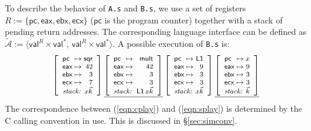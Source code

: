 \documentclass[sigplan,screen,review]{acmart}
\newcommand{\kw}[1]{\ensuremath{ \mathsf{#1} }}
\begin{document}
\begin{example}
To describe the behavior of \texttt{A.s} and \texttt{B.s},
we use a set of registers
$R := \{ \kw{pc}, \kw{eax}, \kw{ebx}, \kw{ecx} \}$
($\kw{pc}$ is the program counter)
together with a stack of pending return addresses.
The corresponding language interface can be defined as
$\tilde{\mathcal{A}} :=
 \langle \kw{val}^R \times \kw{val}^*, \,
         \kw{val}^R \times \kw{val}^* \rangle$.
A possible execution of \texttt{B.s}
is: %
\begin{equation} \label{eqn:splay}
{
  \footnotesize
  \left[
    \begin{array}{l@{{} \mapsto {}}r}
      \kw{pc}  & \kw{sqr} \\
      \kw{eax} & 42 \\
      \kw{ebx} & 3 \\
      \kw{ecx} & 7 \\
      \multicolumn{2}{c}{\textit{stack: } \hfill x \vec{k}}
    \end{array}
  \right] %
  \underline{
    \left[
      \begin{array}{l@{{} \mapsto {}}r}
        \kw{pc}  & \kw{mult} \\
        \kw{eax} & 42 \\
        \kw{ebx} & 3 \\
        \kw{ecx} & 3 \\
        \multicolumn{2}{c}{\textit{stack: } \: \kw{L1} \, x \vec{k}}
      \end{array}
    \right]} %
  \left[
    \begin{array}{l@{{} \mapsto {}}r}
      \kw{pc}  & \kw{L1} \\
      \kw{eax} & 9 \\
      \kw{ebx} & 3 \\
      \kw{ecx} & 3 \\
      \multicolumn{2}{c}{\textit{stack: } \hfill x \vec{k}}
    \end{array}
  \right] %
  \underline{
    \left[
      \begin{array}{l@{{} \mapsto {}}r}
        \kw{pc}  & x \\
        \kw{eax} & 9 \\
        \kw{ebx} & 3 \\
        \kw{ecx} & 3 \\
        \multicolumn{2}{c}{\textit{stack: } \hfill \vec{k}}
      \end{array}
    \right]}
}
\end{equation}
The correspondence between (\ref{eqn:cplay}) and (\ref{eqn:splay})
is determined by the C calling convention in use.
This is discussed in \S\ref{sec:simconv}.
\end{example}
\end{document}
